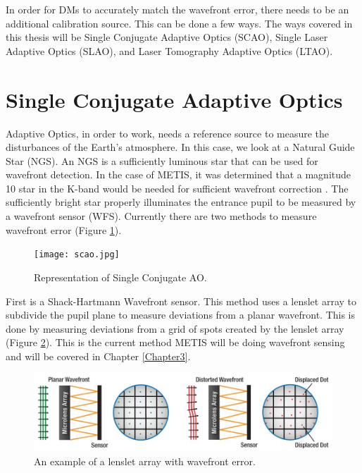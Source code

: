 In order for DMs to accurately match the wavefront error, there needs to be an
additional calibration source.  This can be done a few ways.  The ways covered in
this thesis will be Single Conjugate Adaptive Optics (SCAO), Single Laser Adaptive
Optics (SLAO), and Laser Tomography Adaptive Optics (LTAO).


\section{Single Conjugate Adaptive Optics}

Adaptive Optics, in order to work, needs a reference source to measure the
disturbances of the Earth's atmosphere.  In this case, we look at a Natural Guide
Star (NGS).  An NGS is a sufficiently luminous star that can be used for wavefront
detection.  In the case of METIS, it was determined that a magnitude 10 star in the
K-band would be needed for sufficient wavefront correction \cite{star_mag}.  The
sufficiently bright star properly illuminates the entrance pupil to be measured by a
wavefront sensor (WFS).  Currently there are two methods to measure wavefront error
(Figure \ref{fig:scao}).  

\begin{figure}[h!]
\centering
\texttt{[image: scao.jpg]}
\caption{Representation of Single Conjugate AO\cite{aomode}.}
\label{fig:scao}
\end{figure}

First is a Shack-Hartmann Wavefront sensor.  This method uses a lenslet array to
subdivide the pupil plane to measure deviations from a planar wavefront.  This is
done by measuring deviations from a grid of spots created by the lenslet array
(Figure \ref{fig:Micro_lens_array}).  This is the current method METIS will be doing
wavefront sensing and will be covered in Chapter \ref{Chapter3}.

\begin{figure}[h!]
\centering
\includegraphics[width=14cm]{Figures/MLA.jpg}
\caption{An example of a lenslet array with wavefront error.}
\label{fig:Micro_lens_array}
\end{figure}

